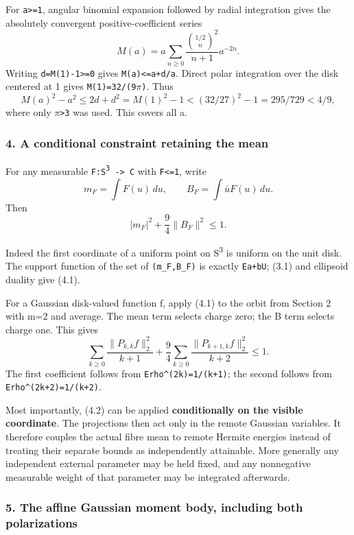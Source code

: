 For \texttt{a\textgreater{}=1}, angular binomial expansion followed by
radial integration gives the absolutely convergent positive-coefficient
series \[
 M(a)=a\sum_{n\ge0}
 \frac{\binom{1/2}{n}^2}{n+1}a^{-2n}.
\] Writing \texttt{d=M(1)-1\textgreater{}=0} gives
\texttt{M(a)\textless{}=a+d/a}. Direct polar integration over the disk
centered at 1 gives \texttt{M(1)=32/(9\ensuremath{\pi})}. Thus \[
 M(a)^2-a^2\le2d+d^2=M(1)^2-1
 <(32/27)^2-1=295/729<4/9,
\] where only \texttt{\ensuremath{\pi}\textgreater{}3} was used. This covers all a.

\subsubsection{4. A conditional constraint retaining the
mean}\label{a-conditional-constraint-retaining-the-mean}

For any measurable \texttt{F:S\textsuperscript{3}\ -\textgreater{}\ C} with
\texttt{\textbar{}F\textbar{}\textless{}=1}, write \[
 m_F=\int F(u)\,du,\qquad B_F=\int\bar u F(u)\,du.
\] Then \[
 |m_F|^2+\frac94\|B_F\|^2\le1.
\tag{4.1}
\]

Indeed the first coordinate of a uniform point on S\textsuperscript{3} is uniform on the
unit disk. The support function of the set of \texttt{(m\_F,B\_F)} is
exactly \texttt{E\textbar{}a+bU\textbar{}}; (3.1) and ellipsoid duality
give (4.1).

For a Gaussian disk-valued function f, apply (4.1) to the orbit from
Section 2 with m=2 and average. The mean term selects charge zero; the B
term selects charge one. This gives \[
 \boxed{\quad
 \sum_{k\ge0}\frac{\|P_{k,k}f\|_2^2}{k+1}
 +\frac94\sum_{k\ge0}\frac{\|P_{k+1,k}f\|_2^2}{k+2}
 \le1.\quad}
\tag{4.2}
\] The first coefficient follows from
\texttt{E\textbar{}rho\textbar{}\^{}(2k)=1/(k+1)}; the second follows
from \texttt{E\textbar{}rho\textbar{}\^{}(2k+2)=1/(k+2)}.

Most importantly, (4.2) can be applied \textbf{conditionally on the
visible coordinate}. The projections then act only in the remote
Gaussian variables. It therefore couples the actual fibre mean to remote
Hermite energies instead of treating their separate bounds as
independently attainable. More generally any independent external
parameter may be held fixed, and any nonnegative measurable weight of
that parameter may be integrated afterwards.

\subsubsection{5. The affine Gaussian moment body, including both
polarizations}\label{the-affine-gaussian-moment-body-including-both-polarizations}

